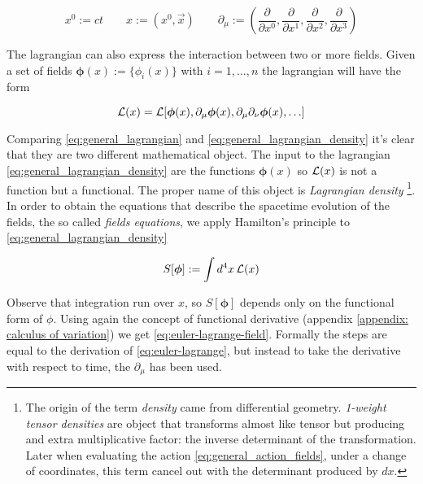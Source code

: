 \begin{equation*}
  x^0 := ct \qquad
  x := (x^0, \vec{x}) \qquad
  \partial_{\mu} := \left(
    \frac{\partial}{\partial x^0},
    \frac{\partial}{\partial x^1},
    \frac{\partial}{\partial x^2},
    \frac{\partial}{\partial x^3}
  \right)
\end{equation*}

The lagrangian can also express the interaction between two or more fields.
Given a set of fields $\bm{\phi}(x):=\{\phi_i(x)\}$ with $i=1,\ldots,n$ the
lagrangian will have the form

\begin{equation} \label{eq:general_lagrangian_density}
  \operatorname{\mathcal{L}}(x) = \operatorname{\mathcal{L}}[
      \bm{\phi}(x),
      \partial_{\mu} \bm{\phi}(x),
      \partial_{\mu} \partial_{\nu} \bm{\phi}(x),
      \ldots
    ]
\end{equation}

Comparing \eqref{eq:general_lagrangian} and
\eqref{eq:general_lagrangian_density} it's clear that they are two different
mathematical object. The input to the lagrangian
\eqref{eq:general_lagrangian_density} are the functions $\bm{\phi}(x)$ so
$\operatorname{\mathcal{L}}(x)$ is not a function but a functional. The proper name of this object
is \emph{Lagrangian density}
\footnote{The origin of the term \emph{density} came from differential geometry.
  \emph{1-weight tensor densities} are object that transforms almost like
  tensor but producing and extra multiplicative factor: the inverse determinant
  of the transformation. Later when evaluating the action
  \eqref{eq:general_action_fields}, under a change of coordinates, this term
  cancel out with the determinant produced by $dx$.
}.
In order to obtain the equations that describe the spacetime evolution of the
fields, the so called \emph{fields equations}, we apply Hamilton's principle to
\eqref{eq:general_lagrangian_density}

\begin{equation} \label{eq:general_action_fields}
  S[\bm{\phi}] := \int d^4x \operatorname{\mathcal{L}}(x)
\end{equation}

Observe that integration run over $x$, so $S[\bm{\phi}]$ depends only on the
functional form of $\phi$. Using again the concept of functional derivative
(appendix \ref{appendix: calculus of variation}) we get
\eqref{eq:euler-lagrange-field}. Formally the steps are equal to the derivation
of \eqref{eq:euler-lagrange}, but instead to take the derivative with respect to
time, the $\partial_{\mu}$ has been used.

